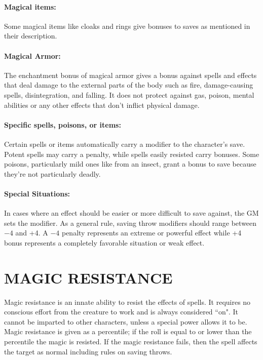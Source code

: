 \begin{multicols}{2}
\paragraph{Magical items:} Some magical items like cloaks and rings give bonuses to saves as mentioned in their description.

\paragraph{Magical Armor:} The enchantment bonus of magical armor gives a bonus against spells and effects that deal damage to the external parts of the body such as fire, damage-causing spells, disintegration, and falling.  It does not protect against gas, poison, mental abilities or any other effects that don't inflict physical damage.

\paragraph{Specific spells, poisons, or items:} Certain spells or items automatically carry a modifier to the character's save.  Potent spells may carry a penalty, while spells easily resisted carry bonuses.  Some poisons, particularly mild ones like from an insect, grant a bonus to save because they're not particularly deadly.

\paragraph{Special Situations:} In cases where an effect should be easier or more difficult to save against, the GM sets the modifier.  As a general rule, saving throw modifiers should range between $-4$ and +4.  A $-4$ penalty represents an extreme or powerful effect while +4 bonus represents a completely favorable situation or weak effect.
 
\section{MAGIC RESISTANCE}

Magic resistance is an innate ability to resist the effects of spells.  It requires no conscious effort from the creature to work and is always considered ``on".  It cannot be imparted to other characters, unless a special power allows it to be.  Magic resistance is given as a percentile; if the roll is equal to or lower than the percentile the magic is resisted.  If the magic resistance fails, then the spell affects the target as normal including rules on saving throws.


\end{multicols}
